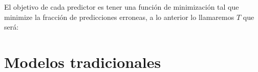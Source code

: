 El objetivo de cada predictor es tener una función de minimización tal que minimize la fracción de predicciones erroneas, a lo anterior lo llamaremos $T$ que será:










\section{Modelos tradicionales}

